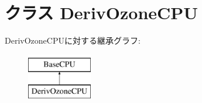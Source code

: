 \hypertarget{classOzoneCPU_1_1DerivOzoneCPU}{
\section{クラス DerivOzoneCPU}
\label{classOzoneCPU_1_1DerivOzoneCPU}
}
DerivOzoneCPUに対する継承グラフ:\begin{figure}[H]
\begin{center}
\leavevmode
\includegraphics[height=2cm]{classOzoneCPU_1_1DerivOzoneCPU}
\end{center}
\end{figure}

